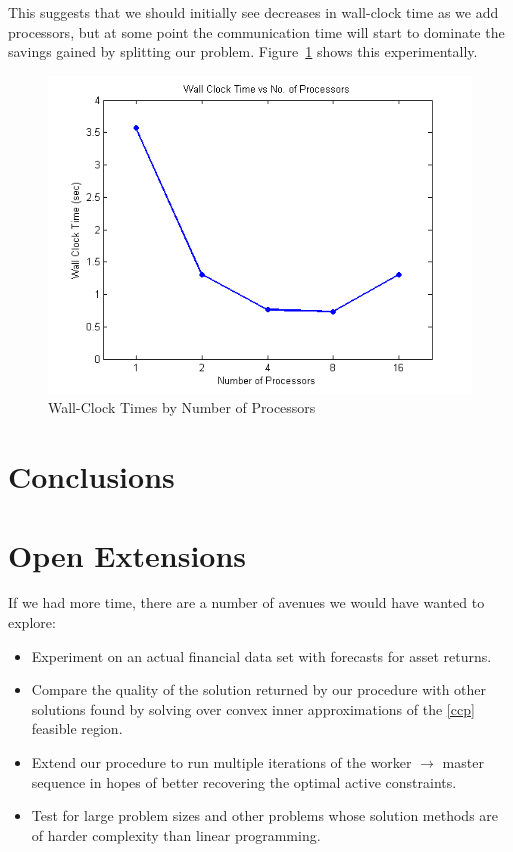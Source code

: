 \documentclass[12pt]{article}
\begin{document}
This suggests that we should initially see decreases in wall-clock time as we add processors, but at some point the communication time will start to dominate the savings gained by splitting our problem.  Figure~\ref{fig:wct_numproc} shows this experimentally. 

\begin{figure}[ht]
    \centering
        \includegraphics{../plot/figs/wct_numproc.png}
    \caption{Wall-Clock Times by Number of Processors}
    \label{fig:wct_numproc}
\end{figure}

\section*{Conclusions}

\section*{Open Extensions}
If we had more time, there are a number of avenues we would have wanted to explore:
\begin{itemize}
\item Experiment on an actual financial data set with forecasts for asset returns.
\item Compare the quality of the solution returned by our procedure with other solutions found by solving over convex inner approximations of the \ref{ccp} feasible region.
\item Extend our procedure to run multiple iterations of the worker $\to$ master sequence in hopes of better recovering the optimal active constraints.
\item Test for large problem sizes and other problems whose solution methods are of harder complexity than linear programming.
\end{itemize}
\end{document}
